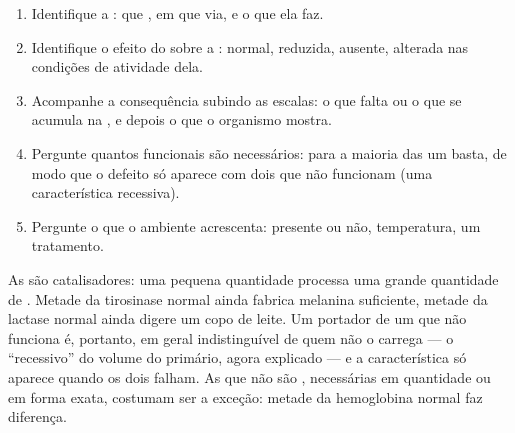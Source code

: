 \begin{method}\label{met:g11:enzymes-and-phenotype:reason}
\begin{enumerate}
  \item Identifique a : que , em que via, e o que ela
        faz.
  \item Identifique o efeito do  sobre a : normal,
        reduzida, ausente, alterada nas condições de atividade dela.
  \item Acompanhe a consequência subindo as escalas: o que falta ou o
        que se acumula na , e depois o que o organismo mostra.
  \item Pergunte quantos  funcionais são necessários: para a
        maioria das  um basta, de modo que o defeito só aparece
        com dois  que não funcionam (uma característica
        recessiva).
  \item Pergunte o que o ambiente acrescenta:  presente ou
        não, temperatura, um tratamento.
\end{enumerate}
\end{method}

\begin{remark}\label{rem:g11:enzymes-and-phenotype:recessive}
As  são catalisadores: uma pequena quantidade processa uma
grande quantidade de . Metade da tirosinase normal ainda
fabrica melanina suficiente, metade da lactase normal ainda digere um
copo de leite. Um portador de um  que não funciona é, portanto,
em geral indistinguível de quem não o carrega --- o ``recessivo'' do
volume do primário, agora explicado --- e a característica só aparece
quando os dois  falham. As  que não são ,
necessárias em quantidade ou em forma exata, costumam ser a exceção:
metade da hemoglobina normal faz diferença.
\end{remark}

